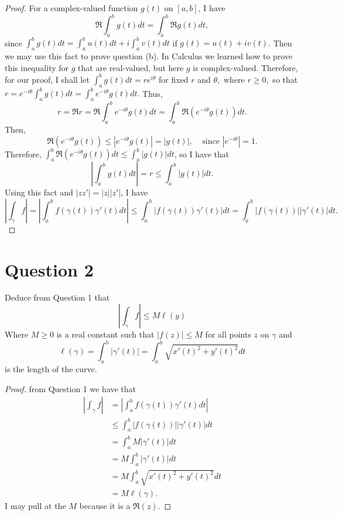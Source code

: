 \documentclass[10pt,two side,openright]{article}
\newcommand{\8}{\bar}
\begin{document}
\begin{proof}
For a complex-valued function $g(t)$ on $[a,b]$, I have 
\[ \Re\int_{a}^{b} g(t) dt = \int_{a}^{b} \Re g(t) dt, \] 
since $\int_{a}^{b} g(t) dt = \int_{a}^{b} u(t) dt + i \int_{a}^{b} v(t) dt$ if $g(t) =  u(t) + iv(t)$. Then we may use this fact to prove question (b). In Calculus we learned how to prove this inequality for $g$ that are real-valued, but here $g$ is complex-valued. Therefore, for our proof, I shall let $\int_{a}^{b} g(t) dt = re^{i\theta}$ for fixed $r$ and $\theta,$ where $r \geq 0,$ so that $r = e^{-i\theta} \int_{a}^{b} g(t) dt = \int_{a}^{b} e^{-i\theta} g(t) dt.$ Thus, 
\[ r = \Re r = \Re \int_{a}^{b} e^{-i\theta} g(t) dt = \int_{a}^{b} \Re(e^{-i\theta}g(t)) dt. \] 
Then, 
\[\Re(e^{-i\theta}g(t)) \leq |e^{-i\theta}g(t) | = |g(t)|, \ \ \ \ \ \text{since $|e^{-i\theta}| = 1.$}\] 
Therefore, $\int_{a}^{b} \Re(e^{-i\theta}g(t))dt \leq \int_{a}^{b} |g(t)| dt$, so I have that 
\[ \left| \int_{a}^{b} g(t) dt \right| = r \leq \int_{a}^{b} |g(t)| dt. \] 
Using this fact and $|zz'| = |z||z'|$, I have 
\[ \left |\int_{\gamma} f \right| = \left | \int_{a}^{b} f(\gamma(t)) \gamma '(t) dt \right| \leq \int_{a}^{b} |f(\gamma(t))\gamma '(t) | dt = \int_{a}^{b} |f(\gamma(t))|| \gamma' (t)| dt.\] 
\end{proof} 

\section{Question 2} 
Deduce from Question 1 that 
\[ \left| \int_{\gamma} f \right| \leq M\ell(y) \]
Where $ M \geq 0$ is a real constant such that $|f(z)| \leq M$ for all points $z$ on $\gamma$ and 
\[ \ell(\gamma) = \int_{a}^{b} |\gamma '(t)| = \int_{a}^{b} \sqrt{ x'(t)^{2} + y'(t)^2} dt\] 
is the length of the curve.

\begin{proof}
from Question 1 we have that
\begin{align*} \left |\int_{\gamma} f \right| &= \left | \int_{a}^{b} f(\gamma(t)) \gamma '(t) dt \right| \\
                                                                 &\leq \int_{a}^{b} |f(\gamma(t))||\gamma '(t) | dt \\
                                                                 &= \int_{a}^{b} M| \gamma' (t)| dt \\
                                                                 &= M \int_{a}^{b} |\gamma '(t)| dt \\
                                                                 & = M \int_{a}^{b}  \sqrt{ x'(t)^{2} + y'(t)^2} dt \\
                                                                 & = M\ell(\gamma).
\end{align*}
I may pull at the $M$ because it is  a $\Re(z)$. 
\end{proof}
\end{document}
